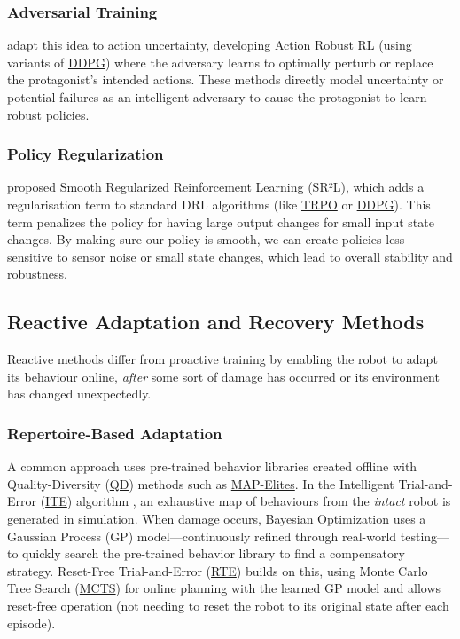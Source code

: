 \documentclass[12pt, a4paper]{article} %
\begin{document}
\subsubsection{Adversarial Training}
\citet{tessler2019action} adapt this idea to action uncertainty, developing Action Robust RL (using variants of \hyperref[def:ddpg]{DDPG}) where the adversary learns to optimally perturb or replace the protagonist's intended actions. These methods directly model uncertainty or potential failures as an intelligent adversary to cause the protagonist to learn robust policies.

\subsubsection{Policy Regularization}
\citet{shen2020deep} proposed Smooth Regularized Reinforcement Learning (\hyperref[def:srl]{SR²L}), which adds a regularisation term to standard DRL algorithms (like \hyperref[def:trpo]{TRPO} or \hyperref[def:ddpg]{DDPG}). This term penalizes the policy for having large output changes for small input state changes. By making sure our policy is smooth, we can create policies less sensitive to sensor noise or small state changes, which lead to overall stability and robustness.

\subsection{Reactive Adaptation and Recovery Methods}
Reactive methods differ from proactive training by enabling the robot to adapt its behaviour online, \textit{after} some sort of damage has occurred or its environment has changed unexpectedly.

\subsubsection{Repertoire-Based Adaptation}
A common approach uses pre-trained behavior libraries created offline with Quality-Diversity (\hyperref[def:qd]{QD}) methods such as \hyperref[def:mapelites]{MAP-Elites}. In the Intelligent Trial-and-Error (\hyperref[def:ite]{ITE}) algorithm \citep{cully2015robots}, an exhaustive map of behaviours from the \textit{intact} robot is generated in simulation. When damage occurs, Bayesian Optimization uses a Gaussian Process (GP) model—continuously refined through real-world testing—to quickly search the pre-trained behavior library to find a compensatory strategy.  Reset-Free Trial-and-Error (\hyperref[def:rte]{RTE})  \citet{chatzilygeroudis2018reset} builds on this, using Monte Carlo Tree Search (\hyperref[def:mcts]{MCTS}) for online planning with the learned GP model and allows reset-free operation (not needing to reset the robot to its original state after each episode).
\end{document}
